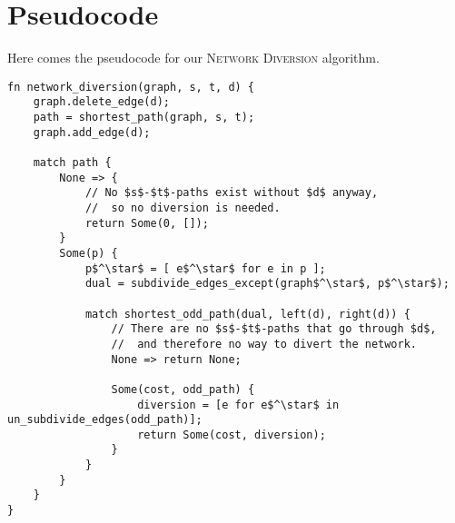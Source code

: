 \section{Pseudocode}
Here comes the pseudocode for our \textsc{Network Diversion} algorithm.

\begin{lstlisting}[caption={Main},label=Listing,mathescape=true]
fn network_diversion(graph, s, t, d) {
    graph.delete_edge(d);
    path = shortest_path(graph, s, t);
    graph.add_edge(d);

    match path {
        None => {
            // No $s$-$t$-paths exist without $d$ anyway,
            //  so no diversion is needed.
            return Some(0, []);
        }
        Some(p) {
            p$^\star$ = [ e$^\star$ for e in p ];
            dual = subdivide_edges_except(graph$^\star$, p$^\star$);

            match shortest_odd_path(dual, left(d), right(d)) {
                // There are no $s$-$t$-paths that go through $d$,
                //  and therefore no way to divert the network.
                None => return None;
                
                Some(cost, odd_path) {
                    diversion = [e for e$^\star$ in un_subdivide_edges(odd_path)];
                    return Some(cost, diversion);
                }
            }
        }
    }
}
\end{lstlisting}
